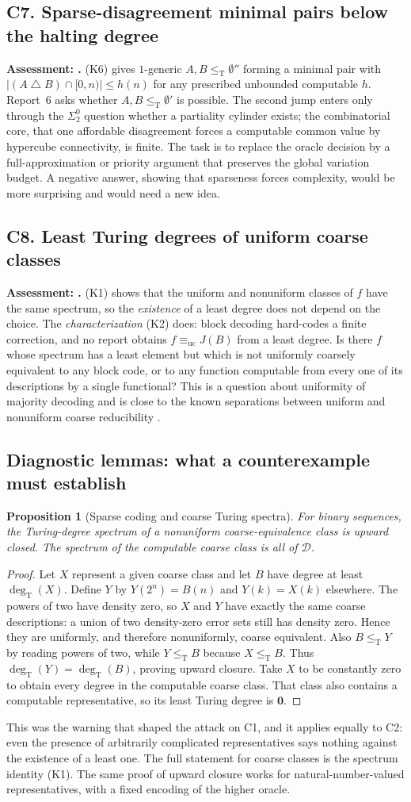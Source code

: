 \documentclass[11pt,a4paper]{article}
\newcommand{\D}{\mathcal D}
\newcommand{\leT}{\leq_{\mathrm T}}
\newcommand{\degT}{\operatorname{deg}_{\mathrm T}}
\newcommand{\problemheading}[3]{\subsection{#1. #2}\label{entry:#1}\noindent\textbf{Assessment: #3.}\enspace}
\newtheorem{proposition}[theorem]{Proposition}
\theoremstyle{definition}\newtheorem{definition}[theorem]{Definition}
\theoremstyle{remark}\newtheorem{remark}[theorem]{Remark}
\begin{document}
\problemheading{C7}{Sparse-disagreement minimal pairs below the halting degree}{\E{}}
(K6) gives $1$-generic $A,B\leT\emptyset''$ forming a minimal pair with $|(A\mathbin\triangle B)\cap[0,n)|\le h(n)$ for any prescribed unbounded computable $h$. Report~6 asks whether $A,B\leT\emptyset'$ is possible. The second jump enters only through the $\Sigma^0_2$ question whether a partiality cylinder exists; the combinatorial core, that one affordable disagreement forces a computable common value by hypercube connectivity, is finite. The task is to replace the oracle decision by a full-approximation or priority argument that preserves the global variation budget. A negative answer, showing that sparseness forces complexity, would be more surprising and would need a new idea.

\problemheading{C8}{Least Turing degrees of uniform coarse classes}{\E{}}
(K1) shows that the uniform and nonuniform classes of $f$ have the same spectrum, so the \emph{existence} of a least degree does not depend on the choice. The \emph{characterization} (K2) does: block decoding hard-codes a finite correction, and no report obtains $f\equiv_{\mathrm{uc}}J(B)$ from a least degree. Is there $f$ whose spectrum has a least element but which is not uniformly coarsely equivalent to any block code, or to any function computable from every one of its descriptions by a single functional? This is a question about uniformity of majority decoding and is close to the known separations between uniform and nonuniform coarse reducibility \cite{HJKS}.

\subsection{Diagnostic lemmas: what a counterexample must establish}
\begin{proposition}[Sparse coding and coarse Turing spectra]\label{prop:sparse}
For binary sequences, the Turing-degree spectrum of a nonuniform coarse-equivalence class is upward closed. The spectrum of the computable coarse class is all of $\D$.
\end{proposition}
\begin{proof}
Let $X$ represent a given coarse class and let $B$ have degree at least $\degT(X)$. Define $Y$ by $Y(2^n)=B(n)$ and $Y(k)=X(k)$ elsewhere. The powers of two have density zero, so $X$ and $Y$ have exactly the same coarse descriptions: a union of two density-zero error sets still has density zero. Hence they are uniformly, and therefore nonuniformly, coarse equivalent. Also $B\leT Y$ by reading powers of two, while $Y\leT B$ because $X\leT B$. Thus $\degT(Y)=\degT(B)$, proving upward closure. Take $X$ to be constantly zero to obtain every degree in the computable coarse class. That class also contains a computable representative, so its least Turing degree is $\mathbf0$.
\end{proof}
This was the warning that shaped the attack on C1, and it applies equally to C2: even the presence of arbitrarily complicated representatives says nothing against the existence of a least one. The full statement for coarse classes is the spectrum identity (K1). The same proof of upward closure works for natural-number-valued representatives, with a fixed encoding of the higher oracle.
\end{document}
